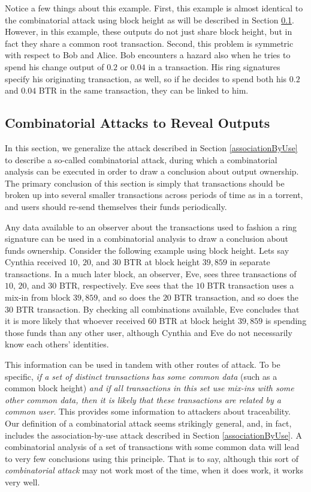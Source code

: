 \documentclass[12pt,english]{mrl}
\theoremstyle{definition}
\numberwithin{equation}{section}
\numberwithin{figure}{section}
\numberwithin{equation}{section}
\numberwithin{equation}{section}
\numberwithin{figure}{section}
\begin{document}
Notice a few things about this example. First, this example is almost identical to the combinatorial attack using block height as will be described in Section \ref{combinationAttacks}. However, in this example, these outputs do not just share block height, but in fact they share a common root transaction. Second, this problem is symmetric with respect to Bob and Alice. Bob encounters a hazard also when he tries to spend his change output of $0.2$ or $0.04$ in a transaction. His ring signatures specify his originating transaction, as well, so if he decides to spend both his $0.2$ and $0.04$ BTR in the same transaction, they can be linked to him. 

\subsection{Combinatorial Attacks to Reveal Outputs}\label{combinationAttacks}

In this section, we generalize the attack described in Section \ref{associationByUse} to describe a so-called combinatorial attack, during which a combinatorial analysis can be executed in order to draw a conclusion about output ownership. The primary conclusion of this section is simply that transactions should be broken up into several smaller transactions across periods of time as in a torrent, and users should re-send themselves their funds periodically. 

Any data available to an observer about the transactions used to fashion a ring signature can be used in a combinatorial analysis to draw a conclusion about funds ownership. Consider the following example using block height. Lets say Cynthia received $10$, $20$, and $30$ BTR at block height $39,859$ in separate transactions. In a much later block, an observer, Eve, sees three transactions of $10$, $20$, and $30$ BTR, respectively. Eve sees that the $10$ BTR transaction uses a mix-in from block $39,859$, and so does the $20$ BTR transaction, and so does the $30$ BTR transaction. By checking all combinations available, Eve concludes that it is more likely that whoever received $60$ BTR at block height $39,859$ is spending those funds than any other user, although Cynthia and Eve do not necessarily know each others' identities. 

This information can be used in tandem with other routes of attack. To be specific, \textit{if a set of distinct transactions has some common data} (such as a common block height) \textit{and if all transactions in this set use mix-ins with some other common data, then it is likely that these transactions are related by a common user}.  This provides some information to attackers about traceability. Our definition of a combinatorial attack seems strikingly general, and, in fact, includes the association-by-use attack described in Section \ref{associationByUse}. A combinatorial analysis of a set of transactions with some common data will lead to very few conclusions using this principle. That is to say, although this sort of \textit{combinatorial attack} may not work most of the time, when it does work, it works very well. 
\end{document}
